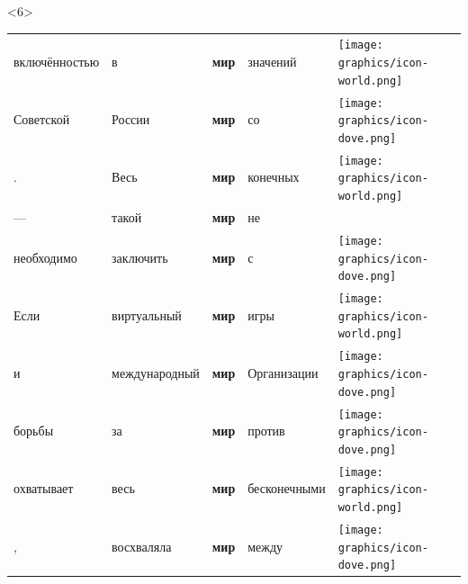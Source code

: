 \documentclass[10pt, compress]{beamer}
\begin{document}
\begin{frame}
\begin{center}
\begin{onlyenv}<6>
\begin{tabular}{p{2.5cm}p{2.5cm}p{1.0cm}p{2.5cm}p{1.0cm}}
включённостью  & в    &  \textbf{мир}  & значений     &   \texttt{[image: graphics/icon-world.png]}     \\
Советской      & России    &  \textbf{мир}  & со     &    \texttt{[image: graphics/icon-dove.png]}    \\
.      & Весь    &  \textbf{мир}  &  конечных    &    \texttt{[image: graphics/icon-world.png]}    \\
—      & такой    &  \textbf{мир}  &  не    &      \\
необходимо      & заключить    &  \textbf{мир}  & с     &  \texttt{[image: graphics/icon-dove.png]}      \\
Если      & виртуальный    &  \textbf{мир}  & игры     &   \texttt{[image: graphics/icon-world.png]}     \\
и      & международный    &  \textbf{мир}  & Организации     &   \texttt{[image: graphics/icon-dove.png]}     \\
борьбы      & за    &  \textbf{мир}  & против     &   \texttt{[image: graphics/icon-dove.png]}     \\
охватывает      & весь    &  \textbf{мир}  &  бесконечными    &  \texttt{[image: graphics/icon-world.png]}      \\
,      & восхваляла    &  \textbf{мир}  & между     &   \texttt{[image: graphics/icon-dove.png]}     \\
\end{tabular}

\end{onlyenv}


\end{center}
\end{frame}
\end{document}

